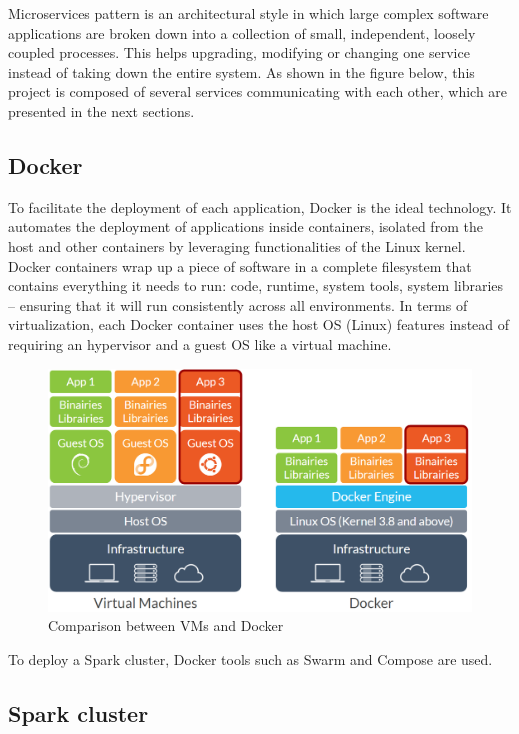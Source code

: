 \documentclass[11pt]{article}
\begin{document}
Microservices pattern is an architectural style in which large complex software applications are broken down into a collection of small, independent, loosely coupled processes. This helps upgrading, modifying or changing one service instead of taking down the entire system. As shown in the figure below, this project is composed of several services communicating with each other, which are presented in the next sections.

\subsection{Docker}

To facilitate the deployment of each application, Docker is the ideal technology. It automates the deployment of applications inside containers, isolated from the host and other containers by leveraging functionalities of the Linux kernel. Docker containers wrap up a piece of software in a complete filesystem that contains everything it needs to run: code, runtime, system tools, system libraries – ensuring that it will run consistently across all environments. In terms of virtualization, each Docker container uses the host OS (Linux) features instead of requiring an hypervisor and a guest OS like a virtual machine.

\begin{figure}[h!]
    \centering
    \includegraphics[scale=0.45]{img/docker-vs-vm.png}
    \caption{Comparison between VMs and Docker}
    \label{docker-vs-vm}
\end{figure}

To deploy a Spark cluster, Docker tools such as Swarm and Compose are used. %

\subsection{Spark cluster}
\end{document}
